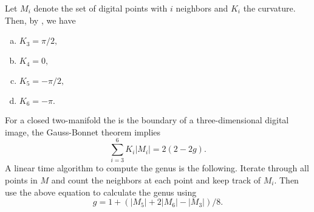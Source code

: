 Let $M_i$ denote the set of digital points with $i$ neighbors and $K_i$
the curvature.
Then, by , we have
\begin{enumerate}[(a)]
\item $K_3=\pi/2,$
\item $K_4=0,$
\item $K_5=-\pi/2,$
\item $K_6=-\pi.$
\end{enumerate}

For a closed two-manifold the is the boundary of a three-dimensional
digital image, the Gauss-Bonnet theorem implies
$$\sum_{i=3}^6K_i |M_i|=2(2-2g).$$
A linear time algorithm to compute the genus is the following.
Iterate through all points in $M$ and count the neighbors at each point
and keep track of $M_i$. Then use the above equation to  calculate the genus
using 
$$g=1+(|M_5|+2|M_6|-|M_3|)/8.$$